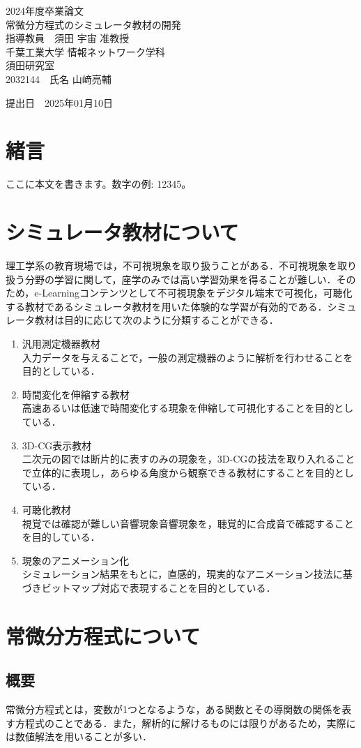\documentclass[a4paper, 12pt]{ltjsarticle}
\newcommand{\coverpage}{
\begin{titlepage}
\begin{center}
\vspace*{1.5cm}

{\LARGE 2024年度卒業論文}\\[2cm] %

{\Huge {常微分方程式のシミュレータ教材の開発}}\\[4cm] %

{\LARGE 指導教員　須田 宇宙 准教授}\\[2cm] %
{\LARGE 千葉工業大学 情報ネットワーク学科}\\[0.5cm] %

{\LARGE 須田研究室}\\[2.5cm] %

{\LARGE {2032144}　氏名 {山﨑亮輔}} \\[1.5cm] %

\vfill
\end{center}

\begin{flushright}
{\LARGE 提出日　\textnormal{2025年01月10日}}\\[1.5cm] %
\end{flushright}

\vfill
\end{titlepage}
}
\begin{document}
\coverpage

\tableofcontents

\clearpage

\section{緒言}
ここに本文を書きます。数字の例: 12345。
\clearpage
\section{シミュレータ教材について}
理工学系の教育現場では，不可視現象を取り扱うことがある．不可視現象を取り扱う分野の学習に関して，座学のみでは高い学習効果を得ることが難しい．そのため，e-Learningコンテンツとして不可視現象をデジタル端末で可視化，可聴化する教材であるシミュレータ教材を用いた体験的な学習が有効的である．シミュレータ教材は目的に応じて次のように分類することができる．
\begin{enumerate}
\item 汎用測定機器教材\\
入力データを与えることで，一般の測定機器のように解析を行わせることを目的としている．
\item 時間変化を伸縮する教材\\
高速あるいは低速で時間変化する現象を伸縮して可視化することを目的としている．
\item 3D-CG表示教材\\
二次元の図では断片的に表すのみの現象を，3D-CGの技法を取り入れることで立体的に表現し，あらゆる角度から観察できる教材にすることを目的としている．
\item 可聴化教材\\
視覚では確認が難しい音響現象音響現象を，聴覚的に合成音で確認することを目的している．
\item 現象のアニメーション化\\
シミュレーション結果をもとに，直感的，現実的なアニメーション技法に基づきビットマップ対応で表現することを目的としている．
\end{enumerate}
\clearpage
\section{常微分方程式について}
\subsection{概要}
常微分方程式とは，変数が1つとなるような，ある関数とその導関数の関係を表す方程式のことである．また，解析的に解けるものには限りがあるため，実際には数値解法を用いることが多い．
\end{document}
